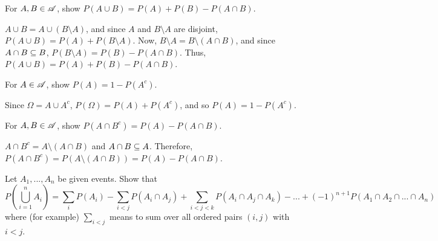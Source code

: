 
\begin{problem}
    For $A, B \in \mathscr{A}$, show $P(A \cup B) = P(A) + P(B) - P(A \cap B)$.
\end{problem}

\begin{solution}
    $A \cup B = A \cup (B \setminus A)$, and since $A$ and $B \setminus A$ are disjoint, $P(A \cup B) = P(A) +P(B \setminus A)$. Now, $B \setminus A = B \setminus (A \cap B)$, and since $A \cap B \subseteq B$, $P(B \setminus A) = P(B) - P(A \cap B)$. Thus, $P(A \cup B) = P(A) + P(B) - P(A \cap B)$.
\end{solution}


\begin{problem}
    For $A \in \mathscr{A}$, show $P(A) = 1 - P(A^c)$.    
\end{problem}

\begin{solution}
    Since $\Omega = A \cup A^c$, $P(\Omega) = P(A) + P(A^c)$, and so $P(A) = 1 - P(A^c)$.
\end{solution}


\begin{problem}
    For $A, B \in \mathscr{A}$, show $P(A \cap B^c) = P(A) - P(A \cap B)$.
\end{problem}

\begin{solution}
    $A \cap B^c = A \setminus (A \cap B)$ and $A \cap B \subseteq A$. Therefore, $P(A \cap B^c) = P(A \setminus (A \cap B)) = P(A) - P(A \cap B)$.
\end{solution}


\begin{problem}
    Let $A_1,..., A_n$ be given events. Show that
    \[ P\left(\bigcup_{i = 1}^n A_i \right) = \sum_{i} P(A_i) - \sum_{i < j} P(A_i \cap A_j) + \sum_{i < j < k} P(A_i \cap A_j \cap A_k) - ... + (-1)^{n + 1} P(A_1 \cap A_2 \cap ... \cap A_n)\]
    where (for example) $\sum_{i < j}$ means to sum over all ordered pairs $(i, j)$ with $i < j$.
\end{problem}

